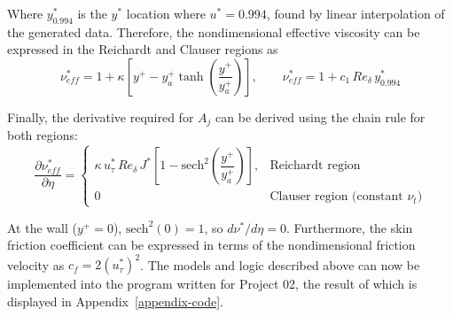 \documentclass[letterpaper,12pt]{article}
\begin{document}
Where $y^*_{0.994}$ is the $y^*$ location where $u^* = 0.994$, found by linear interpolation of the generated data. Therefore, the nondimensional effective viscosity can be expressed in the Reichardt and Clauser regions as
\begin{equation}
    \nu_{eff}^* = 1 + \kappa \left[y^+ - y_{a}^+ \tanh\left(\frac{y^+}{y_{a}^+}\right)\right], \qquad \nu_{eff}^* = 1 + c_1 \, Re_\delta \, y^*_{0.994}
\end{equation}

Finally, the derivative required for $A_j$ can be derived using the chain rule for both regions:
\begin{equation}
    \frac{\partial \nu_{eff}^*}{\partial \eta} = \begin{cases}
        \kappa \, u_\tau^* \, Re_\delta \, J^* \left[1 - \mathrm{sech}^2\!\left(\dfrac{y^+}{y^+_a}\right)\right], & \text{Reichardt region} \\[6pt]
        0 & \text{Clauser region (constant } \nu_t\text{)}
    \end{cases}
\end{equation}

At the wall ($y^+ = 0$), $\mathrm{sech}^2(0) = 1$, so $d\nu^*/d\eta = 0$. Furthermore, the skin friction coefficient can be expressed in terms of the nondimensional friction velocity as $c_f = 2(u_\tau^*)^2$. The models and logic described above can now be implemented into the program written for Project 02, the result of which is displayed in Appendix~\ref{appendix-code}.

\end{document}
